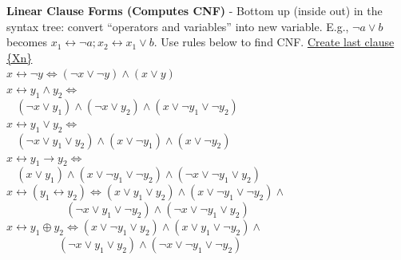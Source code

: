 \documentclass{article}
\begin{document}
\begin{multicols}{4}
\textbf{Linear Clause Forms (Computes CNF)} - Bottom up (inside out) in the syntax tree: convert “operators and variables” into new variable.
E.g., $\neg a \vee b$ becomes $x_1 \leftrightarrow \neg a; x_2 \leftrightarrow x_1 \vee b$. Use rules below to find CNF. \underline{Create last clause \{Xn\}} \\
$x \leftrightarrow \neg y  \Leftrightarrow (\neg x \vee \neg y) \wedge (x \vee y)$ \\
$x \leftrightarrow y_1 \wedge y_2 \Leftrightarrow$ \\
$\ \ \ \ (\neg x \vee y_1) \wedge (\neg x \vee y_2) \wedge (x \vee \neg y_1 \vee \neg y_2)$ \\
$x \leftrightarrow y_1 \vee y_2 \Leftrightarrow$ \\
$\ \ \ \ (\neg x \vee y_1 \vee y_2) \wedge ( x \vee \neg y_1) \wedge (x \vee \neg y_2)$ \\
$x \leftrightarrow y_1 \rightarrow y_2 \Leftrightarrow$ \\
$\ \ \ \ (x \vee y_1) \wedge ( x \vee \neg y_1 \vee \neg y_2) \wedge (\neg x \vee \neg y_1 \vee y_2)$ \\
$x \leftrightarrow (y_1 \leftrightarrow y_2) \Leftrightarrow (x \vee y_1 \vee y_2) \wedge (x \vee \neg y_1 \vee \neg y_2) \wedge$ \\
$\ \ \ \ \ \ \ \ \ \ \ \ \ \ \ \ \ \ \ \ \ \ \ \ (\neg x \vee y_1 \vee \neg y_2) \wedge (\neg x \vee \neg y_1 \vee y_2)$\\
$x \leftrightarrow y_1 \oplus y_2 \Leftrightarrow (x \vee \neg y_1 \vee y_2) \wedge (x \vee y_1 \vee \neg y_2) \wedge$ \\
$\ \ \ \ \ \ \ \ \ \ \ \ \ \ \ \ \ \ \ \ \ (\neg x \vee y_1 \vee y_2) \wedge (\neg x \vee \neg y_1 \vee \neg y_2)$


\end{multicols}
\end{document}
